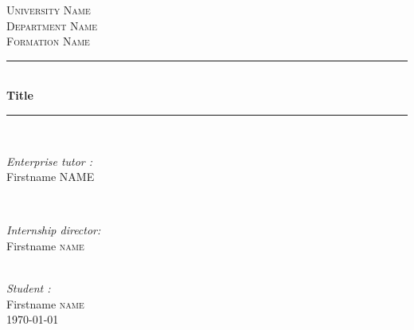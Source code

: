 \begin{titlepage}

\newcommand{\HRule}{\rule{\linewidth}{0.5mm}} %

\center %
 

\textsc{\LARGE University Name}\\[1.5cm] %
\textsc{\Large Department Name}\\[0.5cm] %
\textsc{\large Formation Name}\\[0.5cm] %
\space

\HRule \\[0.4cm]
{ \huge \bfseries Title}\\[0.4cm] %
\HRule \\[1.5cm]

\begin{minipage}{0.4\textwidth}
\begin{flushleft} \large
\emph{Enterprise tutor :}\\
Firstname \textsc{NAME} %
\end{flushleft}
\end{minipage}
~
\begin{minipage}{0.4\textwidth}
\begin{flushright} \large
\emph{Internship director:} \\
Firstname \textsc{name} %
\end{flushright}
\end{minipage}\\[2cm]

\Large \emph{Student :}\\
Firstname \textsc{name}\\[3cm] %

{\large \today}\\[2cm] %


\end{titlepage}
